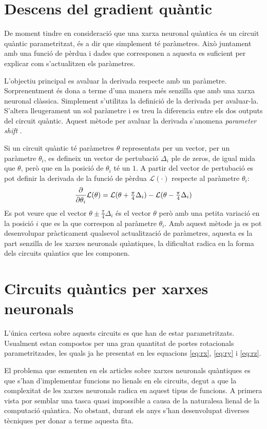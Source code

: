 \section{Descens del gradient quàntic}
De moment tindre en consideració que una xarxa neuronal quàntica és un circuit quàntic parametritzat, és a dir que simplement té paràmetres. Això juntament amb una funció de pèrdua i dades que corresponen a aquesta es suficient per explicar com s'actualitzen els paràmetres. 

L'objectiu principal es avaluar la derivada respecte amb un paràmetre. Sorprenentment és dona a terme d'una manera més senzilla que amb una xarxa neuronal clàssica. Simplement s'utilitza la definició de la derivada per avaluar-la. S'altera lleugerament un sol paràmetre i es treu la diferencia entre els dos outputs del circuit quàntic. Aquest mètode per avaluar la derivada s'anomena \textit{parameter shift} \cite{tfq, shift_parameter_harrow_2019}. 

Si un circuit quàntic té paràmetres $\theta$ representats per un vector, per un paràmetre $\theta_{i}$, es defineix un vector de pertubació $\Delta_i$ ple de zeros, de igual mida que $\theta$, però que en la posició de $\theta_i$ té un $1$. A partir del vector de pertubació es pot definir la derivada de la funció de pèrdua $\mathcal{L}(\cdot)$ respecte al paràmetre $\theta_{i}$:
$$
\pdv{\theta_i} \mathcal{L}(\theta) = \mathcal{L}(\theta + \tfrac{\pi}{4}\Delta_i) - \mathcal{L}(\theta - \tfrac{\pi}{4}\Delta_i)
$$
Es pot veure que el vector $\theta \pm \frac{\pi}{4}\Delta_i$ és el vector $\theta$ però amb una petita variació en la posició $i$ que es la que correspon al paràmetre $\theta_i$. Amb aquest mètode ja es pot desenvolupar pràcticament qualsevol actualització de paràmetres, aquesta es la part senzilla de les xarxes neuronals quàntiques, la dificultat radica en la forma dels circuits quàntics que les componen.

\section{Circuits quàntics per xarxes neuronals}
L'única  certesa sobre aquests circuits es que han de estar parametritzats. Usualment estan compostos per una gran quantitat de portes rotacionals parametritzades, les quals ja he presentat en les equacions \ref{eq:rx}, \ref{eq:ry} i \ref{eq:rz}. 

El problema que esmenten en els articles sobre xarxes neuronals quàntiques es que s'han d'implementar funcions no lienals en els circuits, degut a que la complexitat de les xarxes neuronals radica en aquest tipus de funcions. A primera vista por semblar una tasca quasi impossible a causa de la naturalesa lienal de la computació quàntica. No obstant, durant els anys s'han desenvolupat diverses tècniques per donar a terme aquesta fita. 

